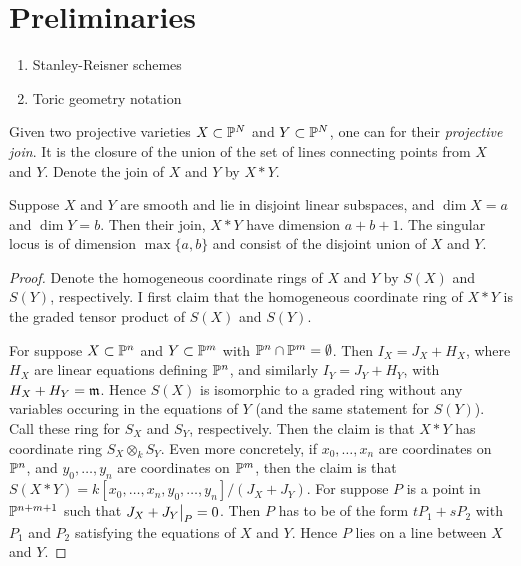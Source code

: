 \chapter{Preliminaries}
\label{sec:prelims}

\begin{enumerate}
	\item Stanley-Reisner schemes
	\item Toric geometry notation
\end{enumerate}


Given two projective varieties $X \subset \P^N$ and $Y \subset \P^N$, one can for their \emph{projective join}. It is the closure of the union of the set of lines connecting points from $X$ and $Y$. Denote the join of $X$ and $Y$ by $X \ast Y$. 

\begin{lemma}
\label{lemma:join}
Suppose $X$ and $Y$ are smooth and lie in disjoint linear subspaces, and $\dim X=a$ and $\dim Y=b$. Then their join, $X \ast Y$ have dimension $a+b+1$. The singular locus is of dimension $\max\{a,b\}$ and consist of the disjoint union of $X$ and $Y$.
\end{lemma}
\begin{proof}
Denote the homogeneous coordinate rings of $X$ and $Y$ by $S(X)$ and $S(Y)$, respectively. I first claim that the homogeneous coordinate ring of $X \ast Y$ is the graded tensor product of $S(X)$ and $S(Y)$. 

For suppose $X \subset \P^n$ and $Y \subset \P^m$ with $\P^n \cap \P^m = \emptyset$. Then $I_X=J_X+H_X$, where $H_X$ are linear equations defining $\P^n$, and similarly $I_Y = J_Y+H_Y$, with $H_X + H_Y=\mm$. Hence $S(X)$ is isomorphic to a graded ring without any variables occuring in the equations of $Y$ (and the same statement for $S(Y)$). Call these ring for $S_X$ and $S_Y$, respectively. Then the claim is that $X \ast Y$ has coordinate ring $S_X \otimes_k S_Y$. Even more concretely, if $x_0,\ldots,x_n$ are coordinates on $\P^n$, and $y_0,\ldots,y_n$ are coordinates on $\P^m$, then the claim is that $S(X \ast Y)=k[x_0,\ldots,x_n,y_0,\ldots,y_n]/(J_X+J_Y)$. For suppose $P$ is a point in $\P^{n+m+1}$ such that $\restr{J_X+J_Y}{P}=0$. Then $P$ has to be of the form $tP_1 + sP_2$ with $P_1$ and $P_2$ satisfying the equations of $X$ and $Y$. Hence $P$ lies on a line between $X$ and $Y$.

\end{proof}


